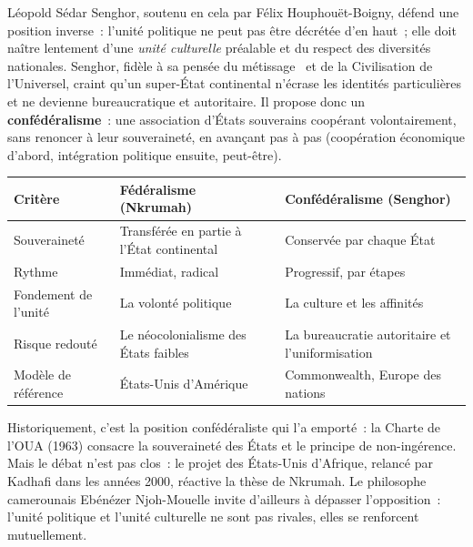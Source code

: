 \documentclass[11pt]{article}
\begin{document}
\begin{propriete}
Léopold Sédar Senghor, soutenu en cela par Félix Houphouët-Boigny, défend une position inverse~: l'unité politique ne peut pas être décrétée d'en haut~; elle doit naître lentement d'une \emph{unité culturelle} préalable et du respect des diversités nationales. Senghor, fidèle à sa pensée du \guillemotleft métissage \guillemotright\ et de la Civilisation de l'Universel, craint qu'un super-État continental n'écrase les identités particulières et ne devienne bureaucratique et autoritaire. Il propose donc un \textbf{confédéralisme}~: une association d'États souverains coopérant volontairement, sans renoncer à leur souveraineté, en avançant pas à pas (coopération économique d'abord, intégration politique ensuite, peut-être).
\end{propriete}

\begin{center}
\begin{tabularx}{\linewidth}{|l|X|X|}
\hline
\rowcolor{popblueL} \textbf{Critère} & \textbf{Fédéralisme (Nkrumah)} & \textbf{Confédéralisme (Senghor)} \\
\hline
Souveraineté & Transférée en partie à l'État continental & Conservée par chaque État \\
\hline
Rythme & Immédiat, radical & Progressif, par étapes \\
\hline
Fondement de l'unité & La volonté politique & La culture et les affinités \\
\hline
Risque redouté & Le néocolonialisme des États faibles & La bureaucratie autoritaire et l'uniformisation \\
\hline
Modèle de référence & États-Unis d'Amérique & Commonwealth, Europe des nations \\
\hline
\end{tabularx}
\end{center}

\begin{aretenir}
Historiquement, c'est la position confédéraliste qui l'a emporté~: la Charte de l'OUA (1963) consacre la souveraineté des États et le principe de non-ingérence. Mais le débat n'est pas clos~: le projet des États-Unis d'Afrique, relancé par Kadhafi dans les années 2000, réactive la thèse de Nkrumah. Le philosophe camerounais Ebénézer Njoh-Mouelle invite d'ailleurs à dépasser l'opposition~: l'unité politique et l'unité culturelle ne sont pas rivales, elles se renforcent mutuellement.
\end{aretenir}
\end{document}
